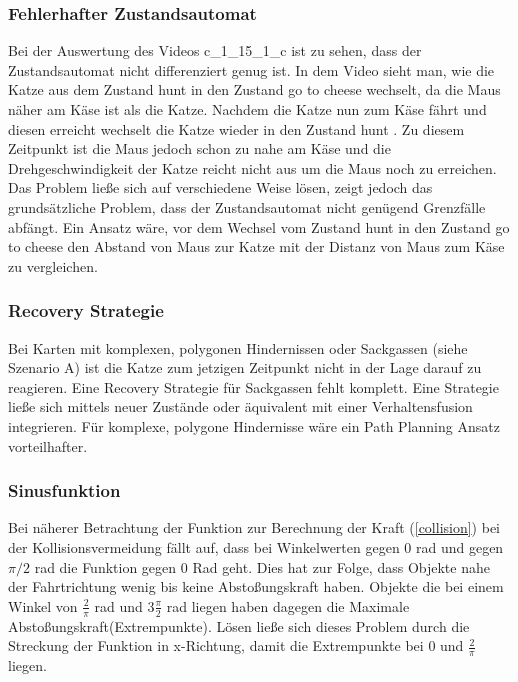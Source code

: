 \documentclass[
a4paper,     %
12pt         %
]{scrartcl}  %
\begin{document}
\subsubsection{Fehlerhafter Zustandsautomat}
Bei der Auswertung des Videos c\_1\_15\_1\_c  ist zu sehen, dass der Zustandsautomat nicht differenziert genug ist. In dem Video sieht man, wie die Katze aus dem Zustand \glqq hunt\grqq{} in den Zustand \glqq go to cheese\grqq{} wechselt, da die Maus näher am Käse ist als die Katze. Nachdem die Katze nun zum Käse fährt und diesen erreicht wechselt die Katze wieder in den Zustand \glqq hunt \grqq{}. Zu diesem Zeitpunkt ist die Maus jedoch schon zu nahe am Käse und die Drehgeschwindigkeit der Katze reicht nicht aus um die Maus noch zu erreichen.
Das Problem ließe sich auf verschiedene Weise lösen, zeigt jedoch das grundsätzliche Problem, dass der Zustandsautomat nicht genügend Grenzfälle abfängt. Ein Ansatz wäre, vor dem Wechsel  vom Zustand \glqq hunt \grqq{} in den Zustand \glqq go to cheese\grqq{} den Abstand von Maus zur Katze mit der Distanz von Maus zum Käse zu vergleichen.
\subsubsection{Recovery Strategie}
Bei Karten mit komplexen, polygonen Hindernissen oder Sackgassen (siehe Szenario A) ist die Katze zum jetzigen Zeitpunkt nicht in der Lage darauf zu reagieren. Eine Recovery Strategie für Sackgassen fehlt komplett. Eine Strategie ließe sich mittels neuer Zustände oder äquivalent mit einer Verhaltensfusion integrieren. Für komplexe, polygone Hindernisse wäre ein Path Planning Ansatz vorteilhafter.
\subsubsection{Sinusfunktion}
Bei näherer Betrachtung der Funktion zur Berechnung der Kraft (\ref{collision}) bei der Kollisionsvermeidung fällt auf, dass bei Winkelwerten gegen 0 rad und gegen $\pi /2$ rad die Funktion gegen 0 Rad geht. Dies hat zur Folge, dass Objekte nahe der Fahrtrichtung wenig bis keine Abstoßungskraft haben.  Objekte die bei einem Winkel von $ \frac{2}{\pi}$ rad und $3 \frac{\pi}{2} $ rad  liegen haben dagegen die Maximale Abstoßungskraft(Extrempunkte).
Lösen ließe sich dieses Problem durch die Streckung der Funktion in x-Richtung, damit die Extrempunkte bei 0 und $ \frac{2}{\pi}$ liegen.
\end{document}
